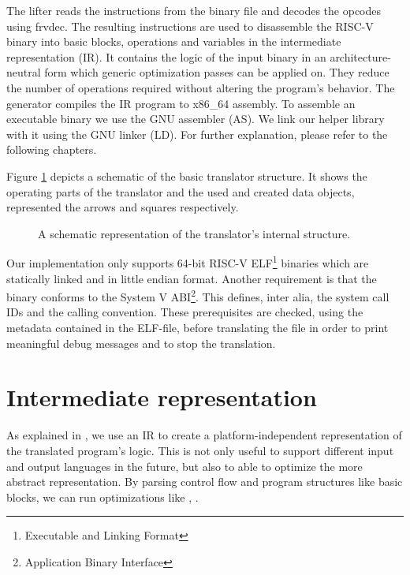 \documentclass[course=eragp]{aspdoc}
\begin{document}
\par

The lifter reads the instructions from the binary file and decodes the opcodes using
frvdec\cite{frvdec}. The resulting instructions are used to disassemble the RISC-V binary into basic
blocks, operations and variables in the intermediate representation (IR). It contains the logic of
the input binary in an architecture-neutral form which generic optimization passes can be applied
on. They reduce the number of operations required without altering the program's behavior. The
generator compiles the IR program to x86\_64 assembly. To assemble an executable binary we use the
GNU assembler (AS)\cite{gnu_binutils}. We link our helper library with it using the GNU linker
(LD)\cite{gnu_binutils}. For further explanation, please refer to the following chapters.

\par

Figure \ref{program_overview} depicts a schematic of the basic translator structure. It shows the
operating parts of the translator and the used and created data objects, represented the arrows and
squares respectively.

\begin{figure}
    \centering
    \caption{
        A schematic representation of the translator's internal structure.
    }
    \label{program_overview}
\end{figure}

\par

Our implementation only supports 64-bit RISC-V ELF\footnote{Executable and Linking Format} binaries
which are statically linked and in little endian format. Another requirement is that the binary
conforms to the System V ABI\footnote{Application Binary Interface}. This defines, inter alia, the
system call IDs and the calling convention. These prerequisites are checked, using the metadata
contained in the ELF-file, before translating the file in order to print meaningful debug messages
and to stop the translation.

\section{Intermediate representation}

As explained in , we use an IR to create a platform-independent
representation of the translated program's logic. This is not only useful to support different input
and output languages in the future, but also to able to optimize the more abstract representation.
By parsing control flow and program structures like basic blocks, we can run optimizations like
, .
\end{document}
